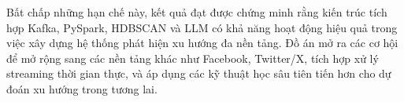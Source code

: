 Bất chấp những hạn chế này, kết quả đạt được chứng minh rằng kiến trúc tích hợp Kafka, PySpark, HDBSCAN và LLM có khả năng hoạt động hiệu quả trong việc xây dựng hệ thống phát hiện xu hướng đa nền tảng. Đồ án mở ra các cơ hội để mở rộng sang các nền tảng khác như Facebook, Twitter/X, tích hợp xử lý streaming thời gian thực, và áp dụng các kỹ thuật học sâu tiên tiến hơn cho dự đoán xu hướng trong tương lai.
